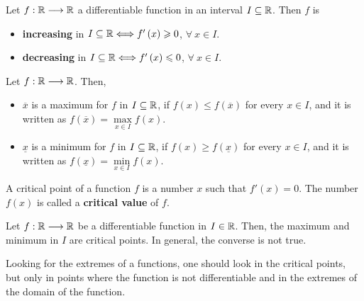 \begin{lemma}\label{lem:monotony-lemma}
    Let $f : \mathbb{R}\longrightarrow \mathbb{R}$ a differentiable function in an interval $I\subseteq\mathbb{R}$. Then $f$ is
    \begin{itemize}[itemsep = -2pt]
        \item \textbf{increasing} in $I\subseteq\mathbb{R}\Longleftrightarrow f'\left( x \right) \geqslant 0$, $\forall\ x\in I$.
            \item \textbf{decreasing} in $I\subseteq\mathbb{R}\Longleftrightarrow f'\left( x \right) \leqslant 0$, $\forall\ x\in I$.
    \end{itemize}
\end{lemma}

\begin{defi}
    Let $f : \mathbb{R}\longrightarrow \mathbb{R}$. Then,
    \begin{itemize}[itemsep = -2pt]
        \item $\overline{x}$ is a maximum for $f$ in $I\subseteq\mathbb{R}$, if $f\left( x \right) \leq f\left( \overline{x} \right)$ for every $x\in I$, and it is written as $f\left( \overline{x} \right) = \underset{x\in I}{\max}f\left( x \right) $.
        \item $\underline{x}$ is a minimum for $f$ in $I\subseteq\mathbb{R}$, if $f\left( x \right) \geq f\left( \underline{x} \right)$ for every $x\in I$, and it is written as $f\left( \underline{x} \right) = \underset{x\in I}{\min}f\left( x \right) $.
    \end{itemize}
\end{defi}

\begin{defi}
    A critical point of a function $f$ is a number $x$ such that $f'\left( x \right) = 0$. The number $f\left( x \right) $ is called a \textbf{critical value} of $f$.
\end{defi}

\begin{lemma}\label{lem:critical-points-max-min}
    Let $f : \mathbb{R}\longrightarrow \mathbb{R}$ be a differentiable function in $I\in\mathbb{R}$. Then, the maximum and minimum in $I$ are
    critical points. In general, the converse is not true.
\end{lemma}

Looking for the extremes of a functions, one should look in the critical points, but only in points where the
function is not differentiable and in the extremes of the domain of the function.


